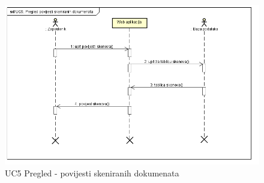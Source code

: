 		\begin{figure}[H]
			\includegraphics[scale=0.8]{slike/UC5 - Pregled povijesti skeniranih dokumenata.png} %
			\centering
			\caption{UC5 Pregled - povijesti skeniranih dokumenata}
			\label{uc5}
		\end{figure}
	
